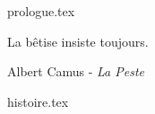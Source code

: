 \documentclass[11pt, a4paper, french]{article}
\begin{document}
    \maketitle
    {prologue.tex}
    \pagebreak

    \epigraph{La bêtise insiste toujours.}{Albert Camus - \textit{La Peste}}\bigskip

    \linespread{1.2}\selectfont
    {histoire.tex}
   
\end{document}

